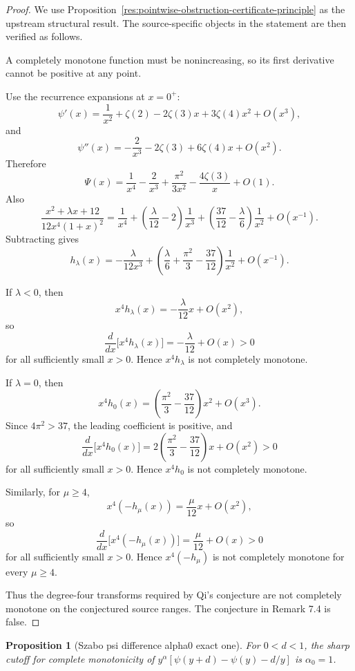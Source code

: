 \documentclass[11pt]{article}
\numberwithin{equation}{section}
\newtheorem{proposition}[theorem]{Proposition}
\theoremstyle{definition}
\theoremstyle{remark}
\newcommand{\1}{\mathbf 1}
\begin{document}
\begin{proof}
We use Proposition~\ref{res:pointwise-obstruction-certificate-principle} as the upstream structural result. The source-specific objects in the statement are then verified as follows.

A completely monotone function must be nonincreasing, so its first derivative cannot be positive at any point.

Use the recurrence expansions at \(x=0^+\):
\[
\psi'(x)=\frac1{x^2}+\zeta(2)-2\zeta(3)x+3\zeta(4)x^2+O(x^3),
\]
and
\[
\psi''(x)=-\frac2{x^3}-2\zeta(3)+6\zeta(4)x+O(x^2).
\]
Therefore
\[
\Psi(x)
=\frac1{x^4}-\frac2{x^3}+\frac{\pi^2}{3x^2}
-\frac{4\zeta(3)}x+O(1).
\]
Also
\[
\frac{x^2+\lambda x+12}{12x^4(1+x)^2}
=\frac1{x^4}+\left(\frac{\lambda}{12}-2\right)\frac1{x^3}
+\left(\frac{37}{12}-\frac{\lambda}{6}\right)\frac1{x^2}
+O(x^{-1}).
\]
Subtracting gives
\[
h_\lambda(x)
=-\frac{\lambda}{12x^3}
+\left(\frac{\lambda}{6}+\frac{\pi^2}{3}-\frac{37}{12}\right)\frac1{x^2}
+O(x^{-1}).
\]

If \(\lambda<0\), then
\[
x^4h_\lambda(x)=-\frac{\lambda}{12}x+O(x^2),
\]
so
\[
\frac{d}{dx}\bigl[x^4h_\lambda(x)\bigr]
=-\frac{\lambda}{12}+O(x)>0
\]
for all sufficiently small \(x>0\). Hence \(x^4h_\lambda\) is not completely monotone.

If \(\lambda=0\), then
\[
x^4h_0(x)
=\left(\frac{\pi^2}{3}-\frac{37}{12}\right)x^2+O(x^3).
\]
Since \(4\pi^2>37\), the leading coefficient is positive, and
\[
\frac{d}{dx}\bigl[x^4h_0(x)\bigr]
=2\left(\frac{\pi^2}{3}-\frac{37}{12}\right)x+O(x^2)>0
\]
for all sufficiently small \(x>0\). Hence \(x^4h_0\) is not completely monotone.

Similarly, for \(\mu\ge4\),
\[
x^4(-h_\mu(x))=\frac{\mu}{12}x+O(x^2),
\]
so
\[
\frac{d}{dx}\bigl[x^4(-h_\mu(x))\bigr]
=\frac{\mu}{12}+O(x)>0
\]
for all sufficiently small \(x>0\). Hence \(x^4(-h_\mu)\) is not completely monotone for every \(\mu\ge4\).

Thus the degree-four transforms required by Qi's conjecture are not completely monotone on the conjectured source ranges. The conjecture in Remark 7.4 is false.
\end{proof}

\begin{proposition}[Szabo psi difference alpha0 exact one]
\label{res:szabo-psi-difference-alpha0-exact-one}
For \(0<d<1\), the sharp cutoff for complete monotonicity of \(y^\alpha[\psi(y+d)-\psi(y)-d/y]\) is \(\alpha_0=1\).
\end{proposition}
\end{document}
